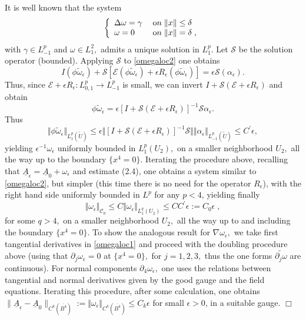 \documentclass[11pt]{article}
\numberwithin{equation}{section} \setlength{\topmargin}{-35pt}
\begin{document}
It is well known that the system
\begin{displaymath}
\left \{
\begin{array}{ll}
\Delta \omega= \gamma
& \;{\mbox on}\; \Vert x\Vert\leq \delta\\
\omega =0 & \;{\mbox on }\;\Vert x\Vert =\delta\;,
\end{array}
\right .
\end{displaymath}
with $\gamma\in L^p_{-1}$ and $\omega\in L^2_1,$  admits a unique
solution in $L^p_1.$ Let $\mathcal S$ be the solution operator
(bounded). Applying $\mathcal S$ to \eqref{omegaloc2} one obtains
$$I(\phi{\tilde\omega}_\epsilon) + \mathcal S[\mathcal{E}
(\phi{\tilde\omega}_\epsilon) +\epsilon R_\epsilon
(\phi{\tilde\omega}_\epsilon)] =\epsilon \mathcal
S(\alpha_\epsilon).$$ Thus, since $\mathcal{E} +\epsilon
R_\epsilon:L^p_{0,1}\to L^p_{-1}$ is small, we can invert $I+
\mathcal S (\mathcal{E} +\epsilon R_\epsilon)$ and
 obtain
$$\phi{\tilde\omega}_\epsilon = \epsilon [I+ \mathcal S (\mathcal{E} +\epsilon R_\epsilon)]^{-1}\mathcal S \alpha_\epsilon.$$
 Thus
 $$\Vert\phi {\tilde\omega}_\epsilon\Vert_{L^p_1(\tilde U)} \leq \epsilon
 \Vert[I+ \mathcal S (\mathcal{E} +\epsilon R_\epsilon)]^{-1}\mathcal S\Vert \Vert \alpha_\epsilon\Vert_{L^p_{-1}(\tilde
U)}\leq C^\prime\epsilon,$$ yielding $\epsilon^{-1}\omega_\epsilon$
uniformly bounded in $L^p_1(U_2),$
 on a smaller neighborhood $U_2,$ all the way up to the
 boundary $\{x^4=0\}.$
 Iterating the procedure above, recalling that $\underline{A}_\epsilon =\underline{A}_0 +
\omega_\epsilon$ and estimate (2.4), one obtains a system similar to
 \eqref{omegaloc2}, but simpler (this time there is
 no need for the operator $R_\epsilon$), with the right hand side
 uniformly bounded in $L^p$ for any $p<4$, yielding finally
 $$\Vert \omega_\epsilon\Vert_{\mathcal{C}_0}\leq C \Vert \omega_\epsilon\Vert_{L^q_1(U_2)}\leq C C^\prime
 \epsilon:= C_0\epsilon\;,$$
 for some $q>4,$ on a smaller neighborhood $U_2,$ all the way up to and including the
 boundary $\{x^4=0\}.$
To show the analogous result for $\nabla \omega_\epsilon,$ we take
first tangential derivatives in \eqref{omegaloc1} and proceed with
the doubling procedure above (using that $\partial_j \omega_\epsilon
= 0$ at $\{x^4=0\},$ for $j=1,2,3,$ thus the one forms $\widetilde
{\partial_j\omega}$ are continuous). For normal components
$\partial_4 \omega_\epsilon,$ one uses the relations between
tangential and normal derivatives given by the good gauge and the
field equations. Iterating this procedure, after some calculation,
one obtains $\|\underline {A}_{\epsilon}-\underline
{A}_0\|_{C^k(\overline{B^4})}:=\Vert \omega_\epsilon
\Vert_{C^k(\overline{B^4})}\le C_k\epsilon$ for small $\epsilon>0$,
in a suitable gauge. \hfill$\Box$
\end{document}
